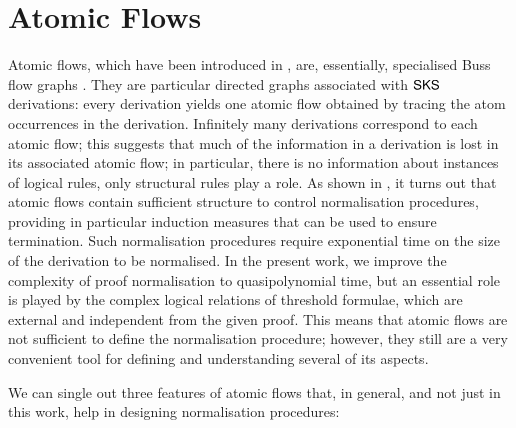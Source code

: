 \section{Atomic Flows}\label{section:AtomicFlows}

Atomic flows, which have been introduced in \cite{GuglGund:07:Normalis:lr}, are, essentially, specialised Buss flow graphs \cite{Buss:91:The-Unde:uq}. They are particular directed graphs associated with $\mathsf{SKS}$ derivations: every derivation yields one atomic flow obtained by tracing the atom occurrences in the derivation. Infinitely many derivations correspond to each atomic flow; this suggests that much of the information in a derivation is lost in its associated atomic flow; in particular, there is no information about instances of logical rules, only structural rules play a role. As shown in \cite{GuglGund:07:Normalis:lr}, it turns out that atomic flows contain sufficient structure to control normalisation procedures, providing in particular induction measures that can be used to ensure termination. Such normalisation procedures require exponential time on the size of the derivation to be normalised. In the present work, we improve the complexity of proof normalisation to quasipolynomial time, but an essential role is played by the complex logical relations of threshold formulae, which are external and independent from the given proof. This means that atomic flows are not sufficient to define the normalisation procedure; however, they still are a very convenient tool for defining and understanding several of its aspects.

We can single out three features of atomic flows that, in general, and not just in this work, help in designing normalisation procedures:

